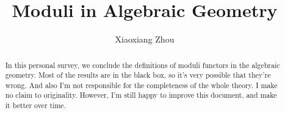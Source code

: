 \documentclass[reqno,11pt]{amsart}
\numberwithin{equation}{section}
\theoremstyle{plain}
\theoremstyle{plain}
\numberwithin{equation}{section}
\theoremstyle{remark}
\begin{document}
\date{}

\title
{Moduli in Algebraic Geometry}


\author{Xiaoxiang Zhou}
\address{School of Mathematical Sciences\\
University of Bonn\\
Bonn, 53115\\ Germany\\} 





\begin{abstract}
In this personal survey, we conclude the definitions of moduli functors in the algebraic geometry. Most of the results are in the black box, so it's very possible that they're wrong. And also I'm not responsible for the completeness of the whole theory. I make no claim to originality. However, I'm still happy to improve this document, and make it better over time.

\end{abstract}

\setcounter{tocdepth}{2}
\maketitle
\tableofcontents 











\end{document}
